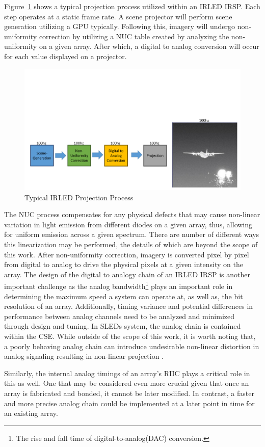 Figure~\ref{fig:typical_projection} shows a typical projection process utilized within an IRLED IRSP. Each step operates at a static frame rate. A scene projector will perform scene generation utilizing a GPU typically. Following this, imagery will undergo non-uniformity correction by utilizing a NUC table created by analyzing the non-uniformity on a given array. After which, a digital to analog conversion will occur for each value displayed on a projector.

\begin{figure}
    \centering
    \includegraphics[trim=0in 0.5in 0in 1.5in,width=1.0\textwidth]{fig/typical_projection_system.pdf}
    \caption{Typical IRLED Projection Process}
    \label{fig:typical_projection}
\end{figure}

The NUC process compensates for any physical defects that may cause non-linear variation in light emission from different diodes on a given array, thus, allowing for uniform emission across a given spectrum. There are number of different ways this linearization may be performed\cite{BrowningEtAl2016, LandwehrEtAl2017, BarakhshanEtAl2019}, the details of which are beyond the scope of this work. After non-uniformity correction, imagery is converted pixel by pixel from digital to analog to drive the physical pixels at a given intensity on the array. The design of the digital to analogy chain of an IRLED IRSP is another important challenge as the analog bandwidth\footnote{The rise and fall time of digital-to-analog(DAC) conversion.} plays an important role in determining the maximum speed a system can operate at, as well as, the bit resolution of an array. Additionally, timing variance and potential differences in performance between analog channels need to be analyzed and minimized through design and tuning. In SLEDs system, the analog chain is contained within the CSE. While outside of the scope of this work, it is worth noting that, a poorly behaving analog chain can introduce undesirable non-linear distortion in analog signaling resulting in non-linear projection \cite{freeman1977slewing, gordon1978linear, ChanEtAl2008}.

Similarly, the internal analog timings of an array's RIIC plays a critical role in this as well. One that may be considered even more crucial given that once an array is fabricated and bonded, it cannot be later modified. In contrast, a faster and more precise analog chain could be implemented at a later point in time for an existing array.

